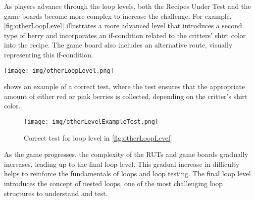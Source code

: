 As players advance through the loop levels, both the Recipes Under Test and the game boards become more complex to increase the challenge. For example, \cref{fig:otherLoopLevel} illustrates a more advanced level that introduces a second type of berry and incorporates an if-condition related to the critters' shirt color into the recipe. The game board also includes an alternative route, visually representing this if-condition.

\begin{figure*}
	\centering
	\texttt{[image: img/otherLoopLevel.png]}
	\caption{Gameboard and instructions for loop level 2}
	\label{fig:otherLoopLevel}
\end{figure*}

 shows an example of a correct test, where the test ensures that the appropriate amount of either red or pink berries is collected, depending on the critter's shirt color.

\begin{figure}
	\centering
	\texttt{[image: img/otherLevelExampleTest.png]}
	\caption{Correct test for loop level in \cref{fig:otherLoopLevel}}
	\label{fig:otherLoopLevelTest}
\end{figure}

As the game progresses, the complexity of the RUTs and game boards gradually increases, leading up to the final loop level. This gradual increase in difficulty helps to reinforce the fundamentals of loops and loop testing. The final loop level introduces the concept of nested loops, one of the most challenging loop structures to understand and test.


